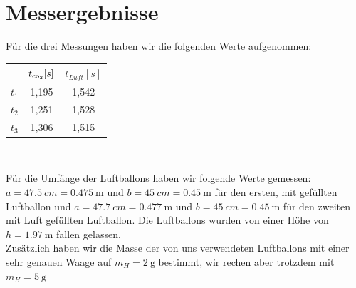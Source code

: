 \documentclass{article}
\begin{document}
    \section{Messergebnisse}
      Für die drei Messungen haben wir die folgenden Werte aufgenommen: \\
      \begin{center}
          \begin{tabular}{|c|c|c|}
              \hline
                        & \( t_{\ce{co2}} [s] \) & \( t_{Luft} [s] \) \\
              \hline
              \( t_1 \) & 1,195                  & 1,542 \\
              \hline
              \( t_2 \) & 1,251                  & 1,528 \\
              \hline
              \( t_3 \) & 1,306                  & 1,515 \\
              \hline
          \end{tabular} \\
      \end{center}
      Für die Umfänge der Luftballons haben wir folgende Werte gemessen:
      \( a = \SI{47.5}{cm} = \SI{0.475}{\metre} \) und \( b = \SI{45}{cm} = \SI{0.45}{\metre} \) für den ersten, mit  gefüllten Luftballon und
      \( a = \SI{47.7}{cm} = \SI{0.477}{\metre} \) und \( b = \SI{45}{cm} = \SI{0.45}{\metre} \) für den zweiten mit Luft gefüllten Luftballon.
      Die Luftballons wurden von einer Höhe von \( h = \SI{1.97}{\metre} \) fallen gelassen. \\
      Zusätzlich haben wir die Masse der von uns verwendeten Luftballons mit einer sehr genauen Waage auf
      \( m_H = \SI{2}{\gram} \) bestimmt, wir rechen aber trotzdem mit \( m_H = \SI{5}{\gram}\)
\end{document}
